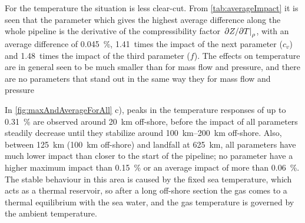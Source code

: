 % 

For the temperature the situation is less clear-cut. From \cref{tab:averageImpact} it is seen that the parameter which gives the highest average difference along the whole pipeline is the derivative of the compressibility factor $\eval{\partial Z/\partial T}_\rho$, with an average difference of \SI{0.045}{\percent}, 1.41~times the impact of the next parameter ($c_v$) and 1.48~times the impact of the third parameter ($f$). The effects on temperature are in general seen to be much smaller than for mass flow and pressure, and there are no parameters that stand out in the same way they for mass flow and pressure

In \cref{fig:maxAndAverageForAll} c), peaks in the temperature responses of up to \SI{0.31}{\percent} are observed around \SI{20}{\kilo\meter} off-shore, before the impact of all parameters steadily decrease until they stabilize around \SIrange{100}{200}{\kilo\meter} off-shore. Also, between \SI{125}{\kilo\meter} (\SI{100}{\kilo\meter} off-shore) and landfall at \SI{625}{\kilo\meter}, all parameters have much lower impact than closer to the start of the pipeline; no parameter have a higher maximum impact than \SI{0.15}{\percent} or an average impact of more than \SI{0.06}{\percent}. %
The stable behaviour in this area is caused by the fixed sea temperature, which acts as a thermal reservoir, so after a long off-shore section the gas comes to a thermal equilibrium with the sea water, and the gas temperature is governed by the ambient temperature.

